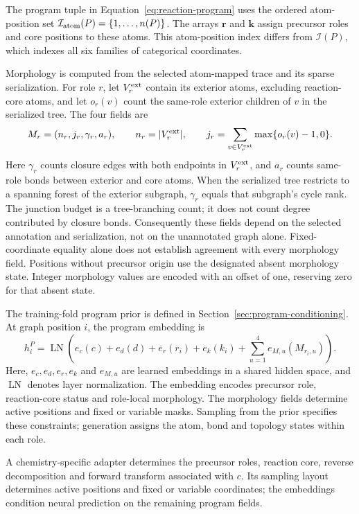 \documentclass{article}
\theoremstyle{definition}
\begin{document}
The program tuple in Equation~\ref{eq:reaction-program} uses the ordered atom-position set
$\mathcal I_{\rm atom}(P)=\{1,\ldots,n(P)\}$. The arrays $\mathbf r$ and $\mathbf k$ assign
precursor roles and core positions to these atoms. This atom-position index differs from
$\mathcal I(P)$, which indexes all six families of categorical coordinates.

Morphology is computed from the selected atom-mapped trace and its sparse serialization.
For role $r$, let $V_r^{\rm ext}$ contain its exterior atoms, excluding reaction-core atoms, and
let $o_r(v)$ count the same-role exterior children of $v$ in the serialized tree. The four fields are
\begin{equation}
 M_r=(n_r,j_r,\gamma_r,a_r),\qquad
 n_r=|V_r^{\rm ext}|,\qquad
 j_r=\sum_{v\in V_r^{\rm ext}}\max\{o_r(v)-1,0\}.
\end{equation}
Here $\gamma_r$ counts closure edges with both endpoints in $V_r^{\rm ext}$, and $a_r$ counts
same-role bonds between exterior and core atoms. When the serialized tree restricts to a spanning
forest of the exterior subgraph, $\gamma_r$ equals that subgraph's cycle rank. The junction budget
is a tree-branching count; it does not count degree contributed by closure bonds. Consequently these
fields depend on the selected annotation and serialization, not on the unannotated graph alone.
Fixed-coordinate equality alone does not establish agreement with every morphology field.
Positions without precursor origin use the designated absent morphology state. Integer morphology
values are encoded with an offset of one, reserving zero for that absent state.

The training-fold program prior is defined in Section~\ref{sec:program-conditioning}.
At graph position $i$, the program embedding is
\begin{equation}
    h_i^P=\operatorname{LN}\!\left(
        e_c(c)+e_d(d)+e_r(r_i)+e_k(k_i)
        +\sum_{u=1}^{4}e_{M,u}(M_{r_i,u})
    \right).
\end{equation}
Here, $e_c,e_d,e_r,e_k$ and $e_{M,u}$ are learned embeddings in a shared hidden space, and
$\operatorname{LN}$ denotes layer normalization. The embedding encodes precursor role, reaction-core
status and role-local morphology. The morphology fields determine active positions and fixed or
variable masks. Sampling from the prior specifies these constraints; generation assigns the atom,
bond and topology states within each role.

A chemistry-specific adapter determines the precursor roles, reaction core, reverse decomposition
and forward transform associated with $c$. Its sampling layout determines active positions and
fixed or variable coordinates; the embeddings condition neural prediction on the remaining
program fields.
\end{document}
